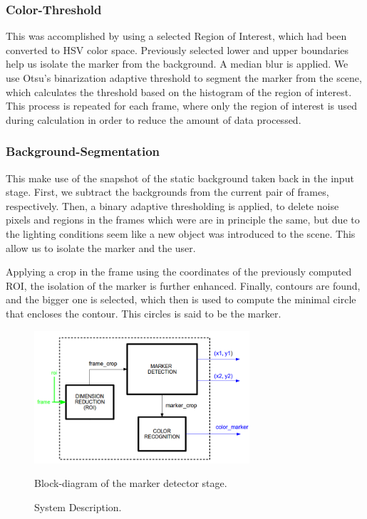 \documentclass[a4paper,12pt]{article}
\begin{document}
\subsubsection{Color-Threshold}
This was accomplished by using a selected Region of Interest, which had been converted to HSV color space. Previously selected lower and upper boundaries help us isolate the marker from the background. A median blur is applied. We use Otsu's binarization adaptive threshold to segment the marker from the scene, which calculates the threshold based on the histogram of the region of interest. This process is repeated for each frame, where only the region of interest is used during calculation in order to reduce the amount of data processed.

\subsubsection{Background-Segmentation}
This make use of the snapshot of the static background taken back in the input stage. First, we subtract the backgrounds from the current pair of frames, respectively. Then, a binary adaptive thresholding is applied, to delete noise pixels and regions in the frames which were are in principle the same, but due to the lighting conditions seem like a new object was introduced to the scene. This allow us to isolate the marker and the user. 

Applying a crop in the frame using the coordinates of the previously computed ROI, the isolation of the marker is further enhanced. Finally, contours are found, and the bigger one is selected, which then is used to compute the minimal circle that encloses the contour. This circles is said to be the marker.


\begin{figure}[H]
    \begin{center}
	\includegraphics[width=8cm]{marker-stage.png}
	\caption{System Description.}
    Block-diagram of the marker detector stage.
	\label{fig:mark}
    \end{center}
\end{figure}
\end{document}
